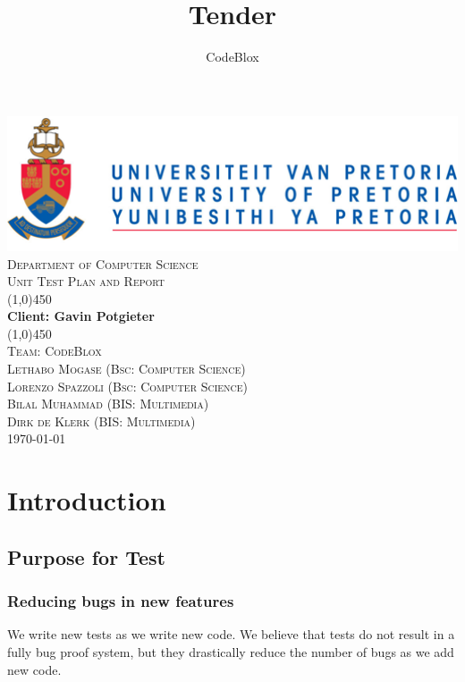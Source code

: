 \documentclass[a4paper,12pt]{article}
\author{CodeBlox}
\title{Tender}
\begin{document}
	\setlength{\parskip}{6pt}
	
	\begin{titlepage}
		\begin{center}
			\includegraphics[width=1\textwidth]{./Pictures/up_logo.png}\\[1.5cm] 
			\textsc{\LARGE Department of Computer Science} \\ [.5cm]
			\textsc{\Large Unit Test Plan and Report} \\ [.5cm]
			\line(1,0){450}\\[.5cm]
			\huge{\bfseries Client: Gavin Potgieter}\\
			\line(1,0){450}\\[.5cm]
			\textsc{\LARGE Team: CodeBlox}\\ [0.5cm]
			
			
			\textsc{\large Lethabo Mogase (Bsc: Computer Science)}\\
			\textsc{\large Lorenzo Spazzoli (Bsc: Computer Science)}\\
			\textsc{\large Bilal Muhammad (BIS: Multimedia)}\\
			\textsc{\large Dirk de Klerk (BIS: Multimedia)}\\ [3.9cm]
			
			\large\today
		\end{center}
	\end{titlepage}
	
	\tableofcontents
	\thispagestyle{empty}
	\footnotesize
	\normalsize
	
	
	
	
	\newpage
	\section{Introduction}
		\subsection{Purpose for Test}
			\subsubsection{Reducing bugs in new features}
			We write new tests as we write new code. We believe that tests do not result in a fully bug proof system, but they drastically reduce the number of bugs as we add new code.
			
\end{document}
